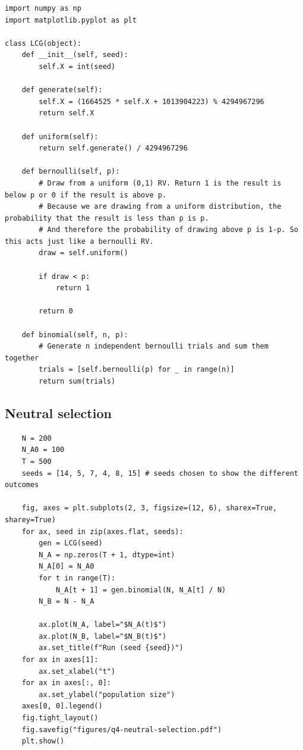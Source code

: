\documentclass[11pt,a4paper]{article}
\begin{document}
\begin{lstlisting}
import numpy as np
import matplotlib.pyplot as plt

class LCG(object):
    def __init__(self, seed):
        self.X = int(seed)

    def generate(self):
        self.X = (1664525 * self.X + 1013904223) % 4294967296
        return self.X
    
    def uniform(self):
        return self.generate() / 4294967296
    
    def bernoulli(self, p):
        # Draw from a uniform (0,1) RV. Return 1 is the result is below p or 0 if the result is above p.
        # Because we are drawing from a uniform distribution, the probability that the result is less than p is p.
        # And therefore the probability of drawing above p is 1-p. So this acts just like a bernoulli RV.
        draw = self.uniform()

        if draw < p:
            return 1
        
        return 0

    def binomial(self, n, p):
        # Generate n independent bernoulli trials and sum them together
        trials = [self.bernoulli(p) for _ in range(n)]
        return sum(trials)
\end{lstlisting}

\subsection*{Neutral selection}


\begin{lstlisting}
    N = 200
    N_A0 = 100
    T = 500
    seeds = [14, 5, 7, 4, 8, 15] # seeds chosen to show the different outcomes

    fig, axes = plt.subplots(2, 3, figsize=(12, 6), sharex=True, sharey=True)
    for ax, seed in zip(axes.flat, seeds):
        gen = LCG(seed)
        N_A = np.zeros(T + 1, dtype=int)
        N_A[0] = N_A0
        for t in range(T):
            N_A[t + 1] = gen.binomial(N, N_A[t] / N)
        N_B = N - N_A

        ax.plot(N_A, label="$N_A(t)$")
        ax.plot(N_B, label="$N_B(t)$")
        ax.set_title(f"Run (seed {seed})")
    for ax in axes[1]:
        ax.set_xlabel("t")
    for ax in axes[:, 0]:
        ax.set_ylabel("population size")
    axes[0, 0].legend()
    fig.tight_layout()
    fig.savefig("figures/q4-neutral-selection.pdf")
    plt.show()
\end{lstlisting}
\end{document}
